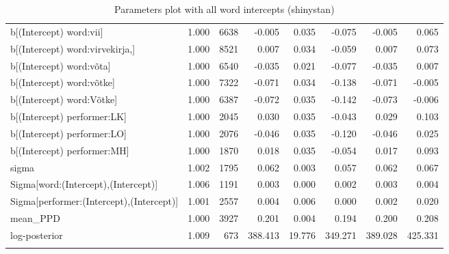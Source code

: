 \begin{longtable}{lrrrrrrr}
  b[(Intercept) word:vii] & 1.000 & 6638 & -0.005 & 0.035 & -0.075 & -0.005 & 0.065 \\ 
  b[(Intercept) word:virvekirja,] & 1.000 & 8521 & 0.007 & 0.034 & -0.059 & 0.007 & 0.073 \\ 
  b[(Intercept) word:võta] & 1.000 & 6540 & -0.035 & 0.021 & -0.077 & -0.035 & 0.007 \\ 
  b[(Intercept) word:võtke] & 1.000 & 7322 & -0.071 & 0.034 & -0.138 & -0.071 & -0.005 \\ 
  b[(Intercept) word:Võtke] & 1.000 & 6387 & -0.072 & 0.035 & -0.142 & -0.073 & -0.006 \\ 
  b[(Intercept) performer:LK] & 1.000 & 2045 & 0.030 & 0.035 & -0.043 & 0.029 & 0.103 \\ 
  b[(Intercept) performer:LO] & 1.000 & 2076 & -0.046 & 0.035 & -0.120 & -0.046 & 0.025 \\ 
  b[(Intercept) performer:MH] & 1.000 & 1870 & 0.018 & 0.035 & -0.054 & 0.017 & 0.093 \\ 
  sigma & 1.002 & 1795 & 0.062 & 0.003 & 0.057 & 0.062 & 0.067 \\ 
  Sigma[word:(Intercept),(Intercept)] & 1.006 & 1191 & 0.003 & 0.000 & 0.002 & 0.003 & 0.004 \\ 
  Sigma[performer:(Intercept),(Intercept)] & 1.001 & 2557 & 0.004 & 0.006 & 0.000 & 0.002 & 0.020 \\ 
  mean\_PPD & 1.000 & 3927 & 0.201 & 0.004 & 0.194 & 0.200 & 0.208 \\ 
  log-posterior & 1.009 &  673 & 388.413 & 19.776 & 349.271 & 389.028 & 425.331 \\ 
   \bottomrule
\caption{Parameters plot with all word intercepts (shinystan)} 
\end{longtable}